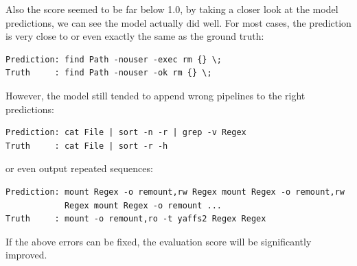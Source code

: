 Also the score seemed to be far below 1.0, by taking a closer look at the model predictions, we can see the model actually did well. For most cases, the prediction is very close to or even exactly the same as the ground truth:
\begin{verbatim}
Prediction: find Path -nouser -exec rm {} \;
Truth     : find Path -nouser -ok rm {} \; 
\end{verbatim}
However, the model still tended to append wrong pipelines to the right predictions:
\begin{verbatim}
Prediction: cat File | sort -n -r | grep -v Regex
Truth     : cat File | sort -r -h 
\end{verbatim}
or even output repeated sequences:
\begin{verbatim}
Prediction: mount Regex -o remount,rw Regex mount Regex -o remount,rw 
            Regex mount Regex -o remount ...
Truth     : mount -o remount,ro -t yaffs2 Regex Regex 
\end{verbatim}
If the above errors can be fixed, the evaluation score will be significantly improved.
